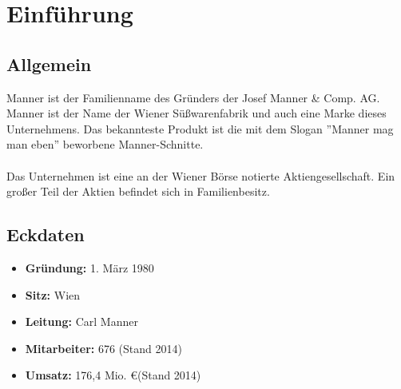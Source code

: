\section{Einführung}
\subsection{Allgemein}
Manner ist der Familienname des Gründers der Josef Manner \& Comp. AG. Manner ist der Name der Wiener Süßwarenfabrik und auch eine Marke dieses Unternehmens. Das bekannteste Produkt ist die mit dem Slogan ''Manner mag man eben'' beworbene Manner-Schnitte. \cite{wiki_manner} \\\\
\noindent
Das Unternehmen ist eine an der Wiener Börse notierte Aktiengesellschaft. Ein großer Teil der Aktien befindet sich in Familienbesitz. \cite{wiki_manner}
\subsection{Eckdaten}
\begin{itemize}
\item \textbf{Gründung: } 1. März 1980
\item \textbf{Sitz: } Wien
\item \textbf{Leitung: } Carl Manner
\item \textbf{Mitarbeiter: } 676 (Stand 2014)
\item \textbf{Umsatz: } 176,4 Mio. \euro (Stand 2014) 
\end{itemize}
\cite{wiki_manner}
